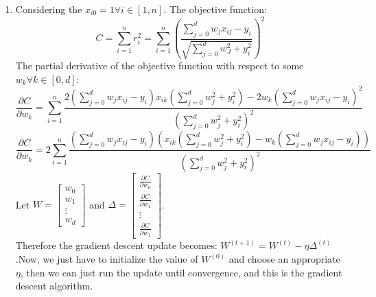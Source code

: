 \documentclass[twoside]{article}
\begin{document}
\begin{enumerate}
    \item
    Considering the $x_{i0} = 1 \forall i \in [1,n]$. The objective function:
    \begin{equation*}
        C = \sum_{i = 1}^n r_i^2 = \sum_{i = 1}^n \left( \frac{\sum_{j = 0}^d w_j x_{ij} - y_i}{\sqrt{\sum_{j=0}^d w_J^2 + y_i^2}} \right)^2
    \end{equation*}
    The partial derivative of the objective function with respect to some $w_k \forall k \in [0,d]$:
    \begin{equation*}
        \frac{\partial C}{\partial w_k} =  \sum_{i = 1}^n \frac{2(\sum_{j=0}^d w_j x_{ij} -y_i)x_{ik}(\sum_{j=0}^d w_j^2 + y_i^2) - 2w_k(\sum_{j=0}^d w_j x_{ij} -y_i)^2}{(\sum_{j=0}^d w_j^2 + y_i^2)^2}
    \end{equation*}
    \begin{equation*}
    	\frac{\partial C}{\partial w_k} =  2\sum_{i = 1}^n \frac{(\sum_{j=0}^d w_j x_{ij} -y_i)\left(x_{ik}(\sum_{j=0}^d w_j^2 + y_i^2) - w_k(\sum_{j=0}^d w_j x_{ij} -y_i)\right)}{(\sum_{j=0}^d w_j^2 + y_i^2)^2}
    \end{equation*}
    Let $W = \begin{bmatrix} w_0\\w_1\\ \vdots\\ w_d \end{bmatrix}$ and $\Delta = \begin{bmatrix} \frac{\partial C}{\partial w_0}\\\frac{\partial C}{\partial w_1}\\ \vdots\\ \frac{\partial C}{\partial w_1} \end{bmatrix}$.\\
    Therefore the gradient descent update becomes: $W^{(t+1)} = W^{(t)} - \eta \Delta ^ {(t)}$.Now, we just have to initialize the value of $W^{(0)}$ and choose an appropriate $\eta$, then we can just run the update until convergence, and this is the gradient descent algorithm.
    
    
\end{enumerate}
\end{document}
